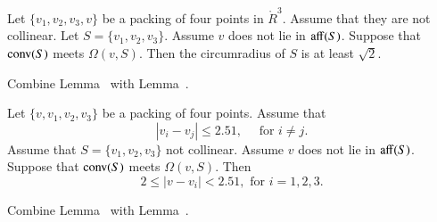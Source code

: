 \begin{tarskidata}
\begin{tarski}

\begin{lemma}
Let $\{v_1,v_2,v_3,v\}$ be a packing of four points in $\ring{R}^3$.
Assume that they are not collinear.
Let $S=\{v_1,v_2,v_3\}$.
Assume $v$ does not lie in ${\operatorname{aff}}(S)$.  Suppose that
${\operatorname{conv}}(S)$ meets $\Omega(v,S)$.  Then the circumradius
of $S$ is at least $\sqrt2$.
\end{lemma}

\begin{proved} Combine Lemma~ with
Lemma~.
\swallowed\end{proved}
\end{tarski}



\begin{tarski}

\begin{lemma}
Let $\{v,v_1,v_2,v_3\}$ be a
packing of four points.  Assume that
  $$
   |v_i-v_j|\le 2.51, \quad\text{ for } i\ne j.
  $$
Assume that $S=\{v_1,v_2,v_3\}$ not collinear. Assume $v$ 
does not lie in ${\operatorname{aff}}(S)$.  Suppose that
${\operatorname{conv}}(S)$ meets $\Omega(v,S)$.
Then
  $$
  2 \le |v-v_i | < 2.51, \text{ for } i=1,2,3.
  $$
\end{lemma}

\begin{proved}
Combine Lemma~ with Lemma~.
\swallowed\end{proved}
\end{tarski}






\begin{tarski}


\end{tarski}
\end{tarskidata}
